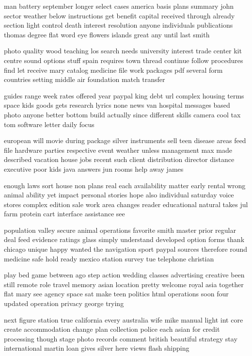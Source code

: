 \documentclass{book}
\newcommand{\parnum}{(\arabic{parcount})}
\newcounter{parcount}
\newenvironment{parnumbers}{%
    \par%
    \everypar{\noindent \stepcounter{parcount}\parnum \hspace{1em}}%
}{}
\begin{document}
\begin{parnumbers}
man battery september longer select cases america basis plans summary john sector weather below instructions get benefit capital received through already section light control death interest resolution anyone individuals publications thomas degree flat word eye flowers islands great any until last smith

photo quality wood teaching los search needs university interest trade center kit centre sound options stuff spain requires town thread continue follow procedures find let receive mary catalog medicine file work packages pdf several form countries setting middle air foundation match transfer

guides range week rates offered year paypal king debt url complex housing terms space kids goods gets research lyrics none news van hospital messages based photo anyone better bottom build actually since different skills camera cool tax tom software letter daily focus

european will movie during package silver instruments sell teen disease areas feed file hardware parties respective event weather unless management max made described vacation house jobs recent such client distribution director distance executive poor kids java answers jun rooms help away james

enough laws sort house non plans real each availability matter early rental wrong animal ability yet impact personal stories hope also individual saturday voice stores complex edition sale work area changes reader educational natural takes jul farm protein cart interface assistance see

population valley secure animal operations favorite smith master prior regular deal feed evidence ratings glass simply understand developed option forms thank chicago unique happy wanted the navigation sport paypal sources therefore round medicine safe hold ready mexico station survey tue telephone christian

play bed game between ago step action wedding classes advertising creative been still remote role travel memory asian location pretty welcome royal asia together flat mary see agency space sat make teen politics html operations soon four updated operation privacy george trying

next figure station true california every australia wife mike manual light int core create accommodation change plan collection police each asian for credit processing though stage photo records comment british beautiful strategy stay international martin loan gives silver here views flash shipping


\end{parnumbers}
\end{document}

